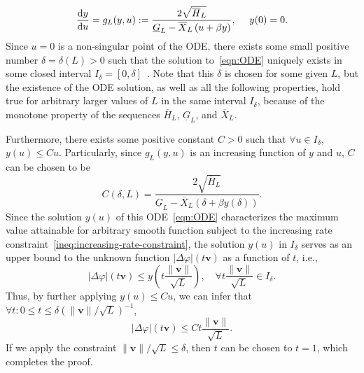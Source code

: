 \documentclass[journal,twocolumn]{IEEEtran}
\theoremstyle{nonumberplain}
\def \d {{\rm d}}
\begin{document}
{\begin{equation}
    \frac{\d y}{\d u} = g_L(y, u) := \frac{2\sqrt{\overline{H}_L}}{\underline{G}_L - \overline{X}_L\left(u+\beta y\right)}, ~~~~y(0)=0.  \label{eqn:ODE}
\end{equation}
Since $u=0$ is a non-singular point of the ODE, there exists some small positive number $\delta=\delta(L)>0$ such that the solution to~\eqref{eqn:ODE} uniquely exists in some closed interval $I_{\delta} = [0,\delta]$~\cite{ince1956ordinary}. Note that this $\delta$ is chosen for some given $L$, but the existence of the ODE solution, as well as all the following properties, hold true for arbitrary larger values of $L$ in the same interval $I_\delta$, because of the monotone property of the sequences $\overline{H}_L$, $\underline{G}_L$, and $\overline{X}_L$. 

Furthermore, there exists some positive constant $C>0$ such that $\forall u\in I_{\delta}$, $y(u)\leq Cu$. Particularly, since $g_L(y,u)$ is an increasing function of $y$ and $u$, $C$ can be chosen to be 
\begin{equation}
    C(\delta, L) = \frac{2\sqrt{\overline{H}_L}}{\underline{G}_L-\overline{X}_L (\delta+\beta y(\delta))}. 
\end{equation} 
Since the solution $y(u)$ of this ODE~\eqref{eqn:ODE} characterizes the maximum value attainable for arbitrary smooth function subject to the increasing rate constraint~\eqref{ineq:increasing-rate-constraint}, the solution $y(u)$ in $I_\delta$ serves as an upper bound to the unknown function $|\Delta\varphi|(t{\bm v})$ as a function of $t$, i.e., 
\begin{equation}
    |\Delta\varphi|(t{\bm v}) \leq y\left(t\frac{\|{\bm v}\|}{\sqrt{L}}\right), \quad \forall t\frac{\|{\bm v}\|}{\sqrt{L}} \in I_\delta.  
\end{equation}
Thus, by further applying $y(u)\leq Cu$, we can infer that $\forall t: 0\leq t \leq \delta (\|{\bm v}\|/\sqrt{L})^{-1}$,
\begin{equation}
    |\Delta\varphi|(t{\bm v}) \leq C t\frac{\|{\bm v}\|}{\sqrt{L}}.
\end{equation} 
If we apply the constraint $\|{\bm v}\|/\sqrt{L}\leq \delta$, then $t$ can be chosen to $t=1$, which completes the proof. 
}

\footnotesize


\end{document}
